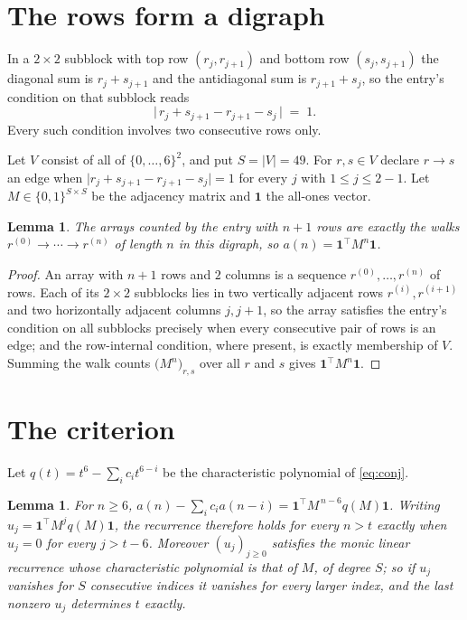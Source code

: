 \documentclass[11pt,a4paper]{article}
\theoremstyle{plain}
\newtheorem{lemma}[theorem]{Lemma}
\theoremstyle{definition}
\begin{document}
\section{The rows form a digraph}

In a $2\times2$ subblock with top row $(r_j,r_{j+1})$ and bottom row $(s_j,s_{j+1})$ the
diagonal sum is $r_j+s_{j+1}$ and the antidiagonal sum is $r_{j+1}+s_j$, so the entry's
condition on that subblock reads
\[
\bigl|\,r_j+s_{j+1}-r_{j+1}-s_j\,\bigr|\;=\;1.
\]
Every such condition involves two consecutive rows only.

Let $V$ consist of all of $\{0,\dots,6\}^{2}$, and put $S=|V|=49$. For $r,s\in V$ declare $r\to s$ an edge
when $\bigl|r_j+s_{j+1}-r_{j+1}-s_j\bigr|=1$ for every $j$ with
$1\le j\le2-1$. Let $M\in\{0,1\}^{S\times S}$ be the adjacency matrix and $\mathbf{1}$
the all-ones vector.

\begin{lemma}\label{lem:walk}
The arrays counted by the entry with $n+1$ rows are exactly the walks
$r^{(0)}\to\cdots\to r^{(n)}$ of length $n$ in this digraph, so
$a(n)=\mathbf{1}^{\!\top}M^{n}\mathbf{1}$.
\end{lemma}

\begin{proof}
An array with $n+1$ rows and $2$ columns is a sequence $r^{(0)},\dots,r^{(n)}$ of
rows. Each of its $2\times2$ subblocks lies in two vertically adjacent rows
$r^{(i)},r^{(i+1)}$ and two horizontally adjacent columns $j,j+1$, so the array satisfies
the entry's condition on all subblocks precisely when every consecutive pair of rows is an
edge; and the row-internal condition, where present, is exactly membership of $V$. Summing
the walk counts $\bigl(M^{n}\bigr)_{r,s}$ over all $r$ and $s$ gives
$\mathbf{1}^{\!\top}M^{n}\mathbf{1}$.
\end{proof}

\section{The criterion}

Let $q(t)=t^{6}-\sum_i c_i t^{6-i}$ be the characteristic polynomial of
\eqref{eq:conj}.

\begin{lemma}\label{lem:crit}
For $n\ge6$,
$a(n)-\sum_i c_i a(n-i)=\mathbf{1}^{\!\top}M^{\,n-6}q(M)\mathbf{1}$. Writing
$u_j=\mathbf{1}^{\!\top}M^{j}q(M)\mathbf{1}$, the recurrence therefore holds for every
$n>t$ exactly when $u_j=0$ for every $j>t-6$. Moreover $(u_j)_{j\ge0}$ satisfies the
monic linear recurrence whose characteristic polynomial is that of $M$, of degree $S$; so
if $u_j$ vanishes for $S$ consecutive indices it vanishes for every larger index, and the
last nonzero $u_j$ determines $t$ exactly.
\end{lemma}
\end{document}
